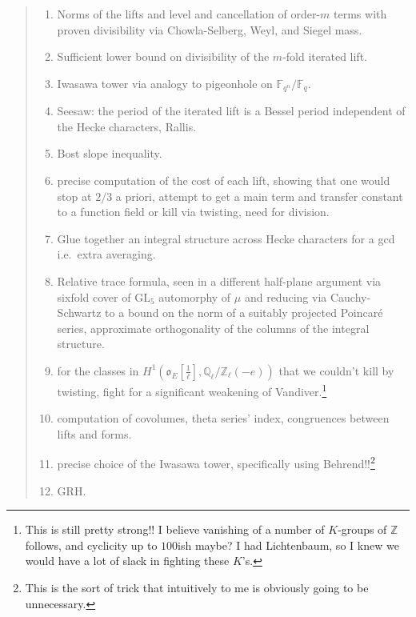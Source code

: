 \documentclass[11pt]{amsbook}
\theoremstyle{plain}
\theoremstyle{definition}
\theoremstyle{remark}
\numberwithin{equation}{section}
\numberwithin{figure}{chapter}
\numberwithin{table}{chapter}
\begin{document}
\begin{quotation}
\begin{enumerate}
\item {} Norms of the lifts and level and cancellation
of order-$m$ terms with proven divisibility via Chowla-Selberg, Weyl, and
Siegel mass.

\item {} Sufficient lower bound on divisibility of the
$m$-fold iterated lift.

\item {} Iwasawa tower via analogy to pigeonhole on
$\mathbb{F}_{q^n}/\mathbb{F}_q$.

\item {} Seesaw: the period of the iterated lift is a
Bessel period independent of the Hecke characters, Rallis.

\item {} Bost slope inequality.

\item {} precise computation of the
\remarkdq cost\remarkdq{} of each lift, showing that one would stop at $2/3$
a priori, attempt to get a main term and transfer constant to a function
field or kill via twisting, need for \remarkdq division\remarkdq.

\item {} Glue together an integral structure across
Hecke characters for a \remarkdq gcd\remarkdq{} i.e.\ extra averaging.

\item {} Relative trace formula, seen in a different
half-plane argument via sixfold cover of $\mathrm{GL}_5$ automorphy of $\mu$
and reducing via Cauchy-Schwartz to a bound on the norm of a suitably
projected Poincar\'e series, approximate orthogonality of the columns of the
integral structure.

\item {} for the classes in
$H^1\left(\mathfrak{o}_E\left[\frac{1}{\ell}\right],
\mathbb{Q}_\ell/\mathbb{Z}_\ell(-e)\right)$ that we couldn't kill by
twisting, fight for a significant weakening of Vandiver.\footnote{This is
still pretty strong!! I believe vanishing of a number of $K$-groups of
$\mathbb{Z}$ follows, and cyclicity up to $100$ish maybe? I had Lichtenbaum,
so I knew we would have a lot of slack in fighting these $K$'s.}

\item {} computation of covolumes, theta series' index,
congruences between lifts and forms.

\item {} precise choice of the Iwasawa tower,
specifically using Behrend!!\footnote{This is the sort of trick that
intuitively to me is obviously going to be unnecessary.}

\item {} GRH.
\end{enumerate}
\end{quotation}
\end{document}

